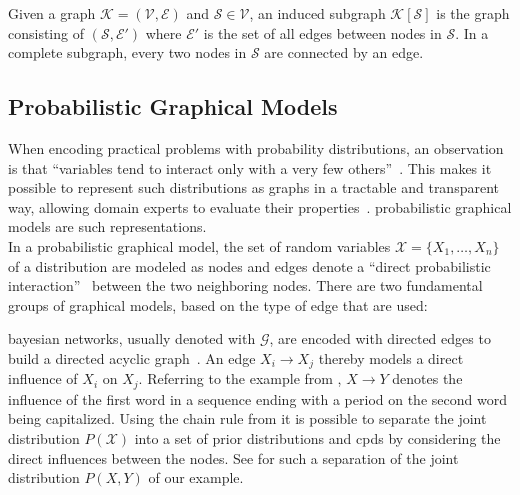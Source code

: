 Given a \gls{graph} $\mathcal{K} = (\mathcal{V},\mathcal{E})$ and $\mathcal{S}\in\mathcal{V}$, an induced \gls{subgraph} $\mathcal{K}[\mathcal{S}]$ is the \gls{graph} consisting of $(\mathcal{S},\mathcal{E'})$ where $\mathcal{E'}$ is the set of all \glspl{edge} between \glspl{node} in $\mathcal{S}$.
In a complete \gls{subgraph}, every two \glspl{node} in $\mathcal{S}$ are connected by an \gls{edge}.

\subsection{Probabilistic Graphical Models}\label{subsec:graphical-models}
When encoding practical problems with \glspl{probability distribution}, an observation is that ``variables tend to interact only with a very few others''~\citep{koller2009probabilistic}.
This makes it possible to represent such distributions as graphs in a tractable and transparent way, allowing domain experts to evaluate their properties~\citep{koller2009probabilistic}.
\Glspl{probabilistic graphical model} are such representations.\\

In a \gls{probabilistic graphical model}, the set of \glspl{random variable} $\mathcal{X}=\{X_1,\dots,X_n\}$ of a distribution are modeled as \glspl{node} and \glspl{edge} denote a ``direct probabilistic interaction''~\citep{koller2009probabilistic} between the two neighboring nodes.
There are two fundamental groups of graphical models, based on the type of edge that are used:

\Glspl{bayesian network}, usually denoted with $\mathcal{G}$, are encoded with directed \glspl{edge} to build a directed acyclic graph~\citep{koller2009probabilistic}.
An \gls{edge} $X_i\to X_j$ thereby models a direct influence of $X_i$ on $X_j$.
Referring to the example from , $X\to Y$ denotes the influence of the first word in a sequence ending with a period on the second word being capitalized.
Using the chain rule from  it is possible to separate the \gls{joint distribution} $P(\mathcal{X})$ into a set of \glspl{prior distribution} and \glspl{cpd} by considering the direct influences between the \glspl{node}.
See  for such a separation of the \gls{joint distribution} $P(X,Y)$ of our example.

